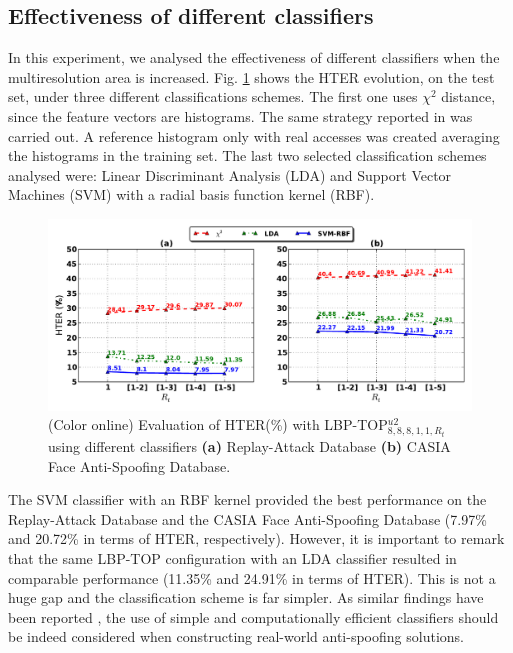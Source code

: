 \subsection{Effectiveness of different classifiers}
\label{sec_different_classifiers}

In this experiment, we analysed the effectiveness of different classifiers when the multiresolution area is increased. Fig. \ref{fig:evaluation_classifiers} shows the HTER evolution, on the test set, under three different classifications schemes. The first one uses $\chi^2$ distance, since the feature vectors are histograms. The same strategy reported in \cite{ChingovskaBIOSIG2012} was carried out. A reference histogram only with real accesses was created averaging the histograms in the training set. The last two selected classification schemes analysed were: Linear Discriminant Analysis (LDA) and Support Vector Machines (SVM) with a radial basis function kernel (RBF).

\begin{figure}[!btb]
\begin{center}
\includegraphics [width=\textwidth] {images/proposed_countermeasure/evaluation_classifiers.pdf}
\caption{(Color online) Evaluation of HTER(\%) with LBP-TOP$_{8,8,8,1,1,R_t}^{u2}$ using different classifiers \textbf{(a)} Replay-Attack Database \textbf{(b)} CASIA Face Anti-Spoofing Database.} \label{fig:evaluation_classifiers}
\end{center}
\end{figure}


The SVM classifier with an RBF kernel provided the best performance on the Replay-Attack Database and the CASIA Face Anti-Spoofing Database (7.97\% and 20.72\% in terms of HTER, respectively). However, it is important to remark that the same LBP-TOP configuration with an LDA classifier resulted in comparable performance (11.35\% and 24.91\% in terms of HTER). This is not a huge gap and the classification scheme is far simpler. As similar findings have been reported \cite{ChingovskaBIOSIG2012,JukkaICB2013}, the use of simple and computationally efficient classifiers should be indeed considered when constructing real-world anti-spoofing solutions.


